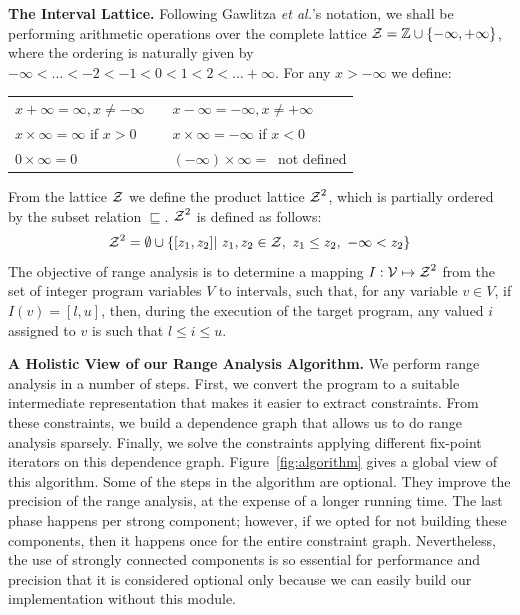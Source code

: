 \documentclass{paper}
\newcommand{\varset}[1]{\mbox{$\cal{#1}$}}
\begin{document}
\noindent
\textbf{The Interval Lattice.}
Following Gawlitza {\em et al.}'s notation, we shall be performing arithmetic
operations over the complete lattice
$\cal{Z} = \mathbb{Z} \cup \{-\infty, +\infty\}$, where the ordering is
naturally given by $-\infty < \ldots < -2 < -1 < 0 < 1 < 2 < \ldots +\infty$.
For any $x > -\infty$ we define:

\begin{tabular}{lcl}
$x + \infty = \infty, x \neq -\infty$ & \mbox{\hspace{0.1cm}} & $x - \infty = - \infty, x \neq +\infty$ \\
$x \times \infty = \infty$ if $x > 0$ & & $x \times \infty = -\infty$ if $x < 0$ \\
$0 \times \infty = 0$ & & $(-\infty) \times \infty = \ $ not defined  \\
\end{tabular}

From the lattice $\varset{Z}$ we define the product lattice
$\varset{Z}^2$, which is partially ordered by the subset relation
$\sqsubseteq$.
$\varset{Z}^2$ is defined as follows:
%
\begin{equation*}
\varset{Z}^2 = \emptyset \cup \{[z_1, z_2] | \ z_1,z_2 \in \varset{Z},
\ z_1 \leq z_2, \  -\infty < z_2 \}
\end{equation*}
%
The objective of range analysis is to determine a mapping
$I: \varset{V} \mapsto \varset{Z}^2$ from the set of integer program variables
$V$ to intervals, such that, for any variable $v \in V$, if
$I(v) = [l, u]$, then, during the execution of the target program, any
valued $i$ assigned to $v$ is such that $l \leq i \leq u$.

\noindent
\textbf{A Holistic View of our Range Analysis Algorithm.}
We perform range analysis in a number of steps.
First, we convert the program to a suitable intermediate representation that
makes it easier to extract constraints.
From these constraints, we build a dependence graph that allows us to do
range analysis sparsely.
Finally, we solve the constraints applying different fix-point iterators on
this dependence graph.
Figure~\ref{fig:algorithm} gives a global view of this algorithm.
Some of the steps in the algorithm are optional.
They improve the precision of the range analysis, at the expense of a longer
running time.
The last phase happens per strong component; however, if we opted for not building 
these components, then it happens once for the entire constraint graph.
Nevertheless, the use of strongly connected components
is so essential for performance and precision that it is considered optional only because we
can easily build our implementation without this module.
\end{document}

